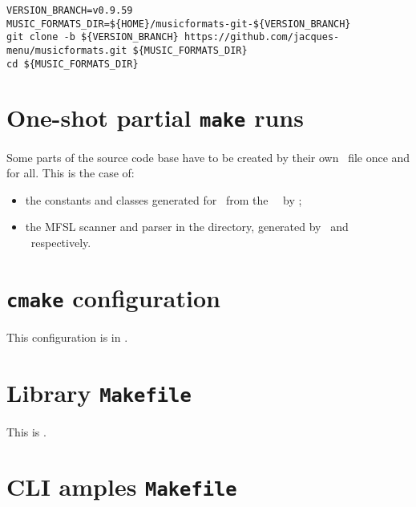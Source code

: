 \begin{lstlisting}[language=Terminal]
VERSION_BRANCH=v0.9.59
MUSIC_FORMATS_DIR=${HOME}/musicformats-git-${VERSION_BRANCH}
git clone -b ${VERSION_BRANCH} https://github.com/jacques-menu/musicformats.git ${MUSIC_FORMATS_DIR}
cd ${MUSIC_FORMATS_DIR}
\end{lstlisting}


\section{One-shot partial {\tt make} runs}

Some parts of the source code base have to be created by their own \make\ file once and for all. This is the case of:
\begin{itemize}
\item the constants and classes generated for \mxsrRepr\ from the \mxml\ \dtd\ by ;
\item the MFSL scanner and parser in the  directory, generated by \flex\ and \bison\ respectively.
\end{itemize}



\section{{\tt cmake} configuration}

This configuration is in .


\section{Library {\tt Makefile}}

This  is .


\section{CLI amples {\tt Makefile}}


